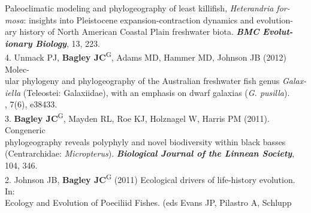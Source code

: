 \documentclass[margin,line]{res}
\begin{document}
\begin{resume}
\hspace*{8mm} Paleoclimatic modeling and phylogeography of least killifish, \emph{Heterandria for-}\\
\hspace*{8mm} \emph{mosa}: insights into Pleistocene expansion-contraction dynamics and evolution-\\
\hspace*{8mm} ary history of North American Coastal Plain freshwater biota. {\it \textbf{BMC Evolut-}\\ \vspace{2mm}
\hspace*{8mm}\textbf{ionary Biology}}, 13, 223. \\
4. Unmack PJ, \textbf{Bagley JC}\textsuperscript{G}, Adams MD, Hammer MD, Johnson JB (2012) Molec-\\
\hspace*{8mm} ular phylogeny and phylogeography of the Australian freshwater fish genus \emph{Galax-}\\
\hspace*{8mm} \emph{iella} (Teleostei: Galaxiidae), with an emphasis on dwarf galaxias (\emph{G. pusilla}).\\ \vspace{2mm}
, 7(6), e38433. \\
3. \textbf{Bagley JC}\textsuperscript{G}, Mayden RL, Roe KJ, Holznagel W, Harris PM (2011). Congeneric\\
\hspace*{8mm} phylogeography reveals polyphyly and novel biodiversity within black basses\\
\hspace*{8mm} (Centrarchidae: \emph{Micropterus}). {\it \textbf{Biological Journal of the Linnean Society}},\\ \vspace{2mm}
\hspace*{8mm}104, 346. \\
2. Johnson JB, \textbf{Bagley JC}\textsuperscript{G} (2011) Ecological drivers of life-history evolution. In:\\
\hspace*{8mm} Ecology and Evolution of Poeciliid Fishes. (eds Evans JP, Pilastro A, Schlupp\\ \vspace{2mm}

\end{resume}
\end{document}

